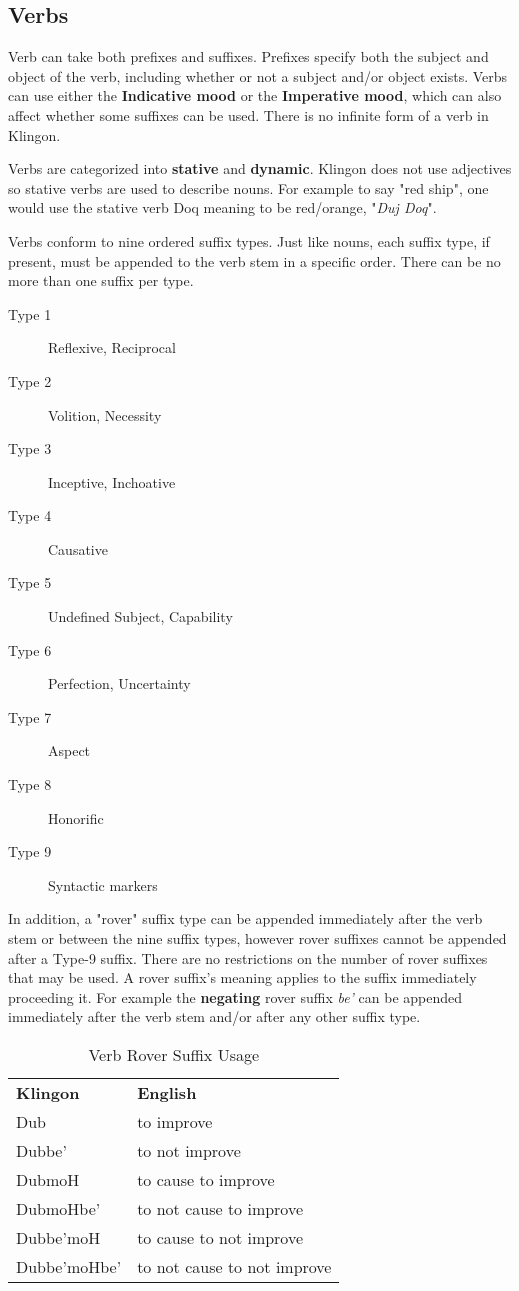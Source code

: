 \documentclass[11pt]{article}
\begin{document}
\subsection {Verbs}

Verb can take both prefixes and suffixes. Prefixes specify both the subject and object of the verb, including whether or not a subject and/or object exists. Verbs can use either the \textbf{Indicative mood} or the \textbf{Imperative mood}, which can also affect whether some suffixes can be used. There is no infinite form of a verb in Klingon.

Verbs are categorized into \textbf{stative} and \textbf{dynamic}. Klingon does not use adjectives so stative verbs are used to describe nouns. For example to say "red ship", one would use the stative verb Doq meaning to be red/orange, "\textit{Duj Doq}".

Verbs conform to nine ordered suffix types. Just like nouns, each suffix type, if present, must be appended to the verb stem in a specific order. There can be no more than one suffix per type.

\begin{description}
	\item[Type 1] Reflexive, Reciprocal
	\item[Type 2] Volition, Necessity
	\item[Type 3] Inceptive, Inchoative
	\item[Type 4] Causative
	\item[Type 5] Undefined Subject, Capability
	\item[Type 6] Perfection, Uncertainty
	\item[Type 7] Aspect
	\item[Type 8] Honorific
	\item[Type 9] Syntactic markers
\end{description}

In addition, a "rover" suffix type can be appended immediately after the verb stem or between the nine suffix types, however rover suffixes cannot be appended after a Type-9 suffix. There are no restrictions on the number of rover suffixes that may be used. A rover suffix's meaning applies to the suffix immediately proceeding it. For example the \textbf{negating} rover suffix \textit{be'} can be appended immediately after the verb stem and/or after any other suffix type.

\begin{table}[h]
\begin{center}
\begin{tabular}{l|l}
\bf Klingon & \bf English \\
Dub & to improve \\
Dubbe' & to not improve \\
DubmoH & to cause to improve \\
DubmoHbe' & to not cause to improve \\
Dubbe'moH & to cause to not improve \\
Dubbe'moHbe' & to not cause to not improve
\end{tabular}
\end{center}
\caption{Verb Rover Suffix Usage }
\end{table}
\end{document}
